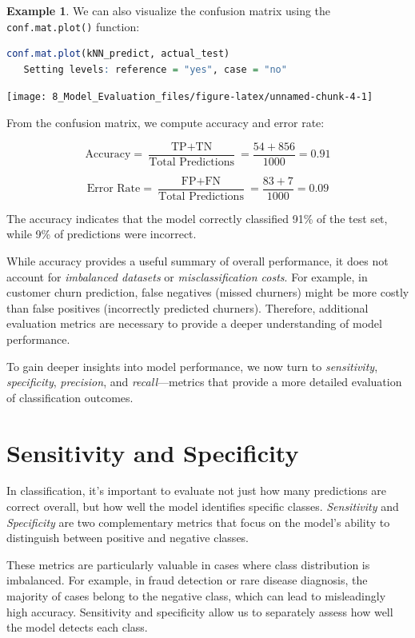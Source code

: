 \documentclass[
  11pt,
]{book}
\newcommand{\passthrough}[1]{#1}
\theoremstyle{definition}
\theoremstyle{definition}
\newtheorem{example}{Example}[chapter]
\theoremstyle{definition}
\theoremstyle{definition}
\theoremstyle{remark}
\begin{document}
\begin{example}
We can also visualize the confusion matrix using the \passthrough{\lstinline!conf.mat.plot()!} function:

\begin{lstlisting}[language=R]
conf.mat.plot(kNN_predict, actual_test)
   Setting levels: reference = "yes", case = "no"
\end{lstlisting}

\begin{center}\texttt{[image: 8\_Model\_Evaluation\_files/figure-latex/unnamed-chunk-4-1]} \end{center}

From the confusion matrix, we compute accuracy and error rate:

\[
\text{Accuracy} = \frac{\text{TP} + \text{TN}}{\text{Total Predictions}} = \frac{54 + 856}{1000} = 0.91
\]

\[
\text{Error Rate} = \frac{\text{FP} + \text{FN}}{\text{Total Predictions}} = \frac{83 + 7}{1000} = 0.09
\]

The accuracy indicates that the model correctly classified 91\% of the test set, while 9\% of predictions were incorrect.
\end{example}

While accuracy provides a useful summary of overall performance, it does not account for \emph{imbalanced datasets} or \emph{misclassification costs}. For example, in customer churn prediction, false negatives (missed churners) might be more costly than false positives (incorrectly predicted churners). Therefore, additional evaluation metrics are necessary to provide a deeper understanding of model performance.

To gain deeper insights into model performance, we now turn to \emph{sensitivity}, \emph{specificity}, \emph{precision}, and \emph{recall}---metrics that provide a more detailed evaluation of classification outcomes.

\section{Sensitivity and Specificity}\label{sensitivity-and-specificity}

In classification, it's important to evaluate not just how many predictions are correct overall, but how well the model identifies specific classes. \emph{Sensitivity} and \emph{Specificity} are two complementary metrics that focus on the model's ability to distinguish between positive and negative classes.

These metrics are particularly valuable in cases where class distribution is imbalanced. For example, in fraud detection or rare disease diagnosis, the majority of cases belong to the negative class, which can lead to misleadingly high accuracy. Sensitivity and specificity allow us to separately assess how well the model detects each class.
\end{document}
